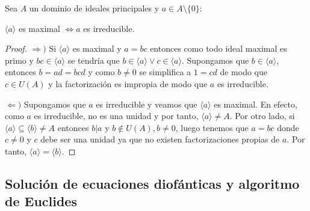 \begin{proposition}
Sea $A$ un dominio de ideales principales y $a \in A \setminus \{0\}$:

$\langle a \rangle$ es maximal $\iff a$ es irreducible.
\end{proposition}
\begin{proof}
$\Rightarrow)$ Si $\langle a \rangle$ es maximal y $a = bc$ entonces como todo ideal maximal es primo y $bc \in \langle a \rangle$ se tendría que $b \in \langle a \rangle \lor c \in \langle a \rangle$. Supongamos que $b \in \langle a \rangle$, entonces $b = ad = bcd$ y como $b \neq 0$ se simplifica a $1 = cd$ de modo que $c \in U(A)$ y la factorización es impropia de modo que $a$ es irreducible. 

$\Leftarrow)$ Supongamos que $a$ es irreducible y veamos que $\langle a \rangle$ es maximal. En efecto, como $a$ es irreducible, no es una unidad y por tanto, $\langle a \rangle \neq A$. Por otro lado, si $\langle a \rangle \subseteq \langle b \rangle \neq A$  entonces $b|a$ y $b \notin U(A), b \neq 0$, luego tenemos que $a = bc$ donde $c \neq 0$ y $c$ debe ser una unidad ya que no existen factorizaciones propias de $a$. Por tanto, $\langle a \rangle = \langle b \rangle$.
\end{proof}


\subsection{Solución de ecuaciones diofánticas y algoritmo de Euclides}

